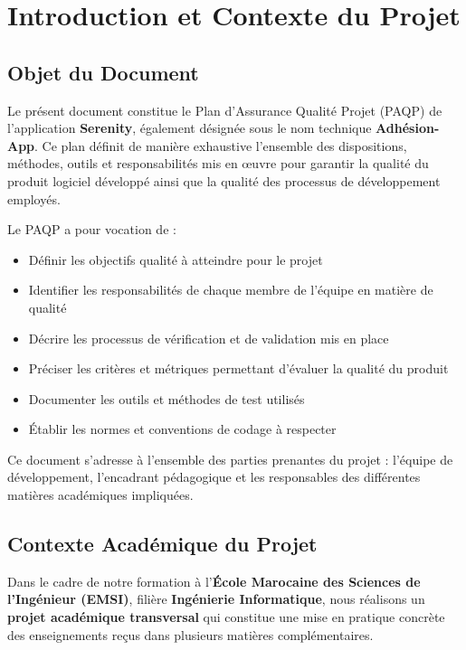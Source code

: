 \documentclass[12pt,a4paper]{report}
\begin{document}
\chapter{Introduction et Contexte du Projet}

\section{Objet du Document}

Le présent document constitue le Plan d'Assurance Qualité Projet (PAQP) de l'application \textbf{Serenity}, également désignée sous le nom technique \textbf{Adhésion-App}. Ce plan définit de manière exhaustive l'ensemble des dispositions, méthodes, outils et responsabilités mis en œuvre pour garantir la qualité du produit logiciel développé ainsi que la qualité des processus de développement employés.

Le PAQP a pour vocation de :
\begin{itemize}
    \item Définir les objectifs qualité à atteindre pour le projet
    \item Identifier les responsabilités de chaque membre de l'équipe en matière de qualité
    \item Décrire les processus de vérification et de validation mis en place
    \item Préciser les critères et métriques permettant d'évaluer la qualité du produit
    \item Documenter les outils et méthodes de test utilisés
    \item Établir les normes et conventions de codage à respecter
\end{itemize}

Ce document s'adresse à l'ensemble des parties prenantes du projet : l'équipe de développement, l'encadrant pédagogique et les responsables des différentes matières académiques impliquées.

\section{Contexte Académique du Projet}

Dans le cadre de notre formation à l'\textbf{École Marocaine des Sciences de l'Ingénieur (EMSI)}, filière \textbf{Ingénierie Informatique}, nous réalisons un \textbf{projet académique transversal} qui constitue une mise en pratique concrète des enseignements reçus dans plusieurs matières complémentaires.
\end{document}
